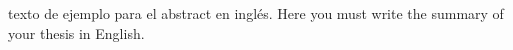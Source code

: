 texto de ejemplo para el abstract en inglés. Here you must write the summary of your thesis in English.